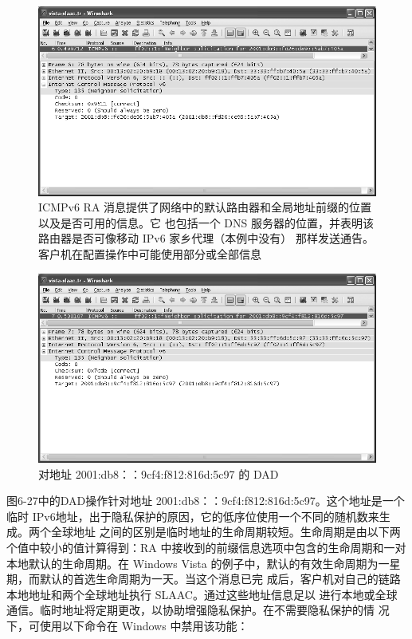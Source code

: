 \begin{figure}[H]
    \centering
	\includegraphics[scale=0.5]{imgs/6/6-26.png}
	\caption{ICMPv6 RA 消息提供了网络中的默认路由器和全局地址前缀的位置以及是否可用的信息。它
    也包括一个 DNS 服务器的位置，并表明该路由器是否可像移动 IPv6 家乡代理（本例中没有）
    那样发送通告。客户机在配置操作中可能使用部分或全部信息}
\end{figure}

\begin{figure}[H]
    \centering
	\includegraphics[scale=0.5]{imgs/6/6-27.png}
	\caption{对地址 2001:db8：：9cf4:f812:816d:5c97 的 DAD}
\end{figure}

图6-27中的DAD操作针对地址 2001:db8：：9cf4:f812:816d:5c97。这个地址是一个临时
IPv6地址，出于隐私保护的原因，它的低序位使用一个不同的随机数来生成。两个全球地址
之间的区别是临时地址的生命周期较短。生命周期是由以下两个值中较小的值计算得到：RA
中接收到的前缀信息选项中包含的生命周期和一对本地默认的生命周期。在 Windows Vista
的例子中，默认的有效生命周期为一星期，而默认的首选生命周期为一天。当这个消息已完
成后，客户机对自己的链路本地地址和两个全球地址执行 SLAAC。通过这些地址信息足以
进行本地或全球通信。临时地址将定期更改，以协助增强隐私保护。在不需要隐私保护的情
况下，可使用以下命令在 Windows 中禁用该功能：


